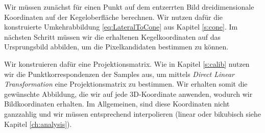 Wir müssen zunächst für einen Punkt auf dem entzerrten Bild  dreidimensionale Koordinaten auf der Kegeloberfläche berechnen. Wir nutzen dafür die konstruierte Umkehrabbildung \ref{eq:LateralToCone} aus Kapitel \ref{s:cone}. Im nächsten Schritt müssen wir die erhaltenen Kegelkoordinaten auf das Ursprungsbild abbilden, um die Pixelkandidaten bestimmen zu können.

Wir konstruieren dafür eine Projektionsmatrix. Wie in Kapitel \ref{s:calib} nutzen wir die  Punktkorrespondenzen der Samples aus, um mittels \textit{Direct Linear Transformation} eine Projektionsmatrix zu bestimmen.
Wir erhalten somit die gewünschte Abbildung, die wir auf jede 3D-Koordinate anwenden, wodurch wir Bildkoordinaten erhalten. Im Allgemeinen, sind diese Koordinaten nicht ganzzahlig und wir müssen entsprechend interpolieren (linear oder bikubisch siehe Kapitel \ref{ch:analysis}).


